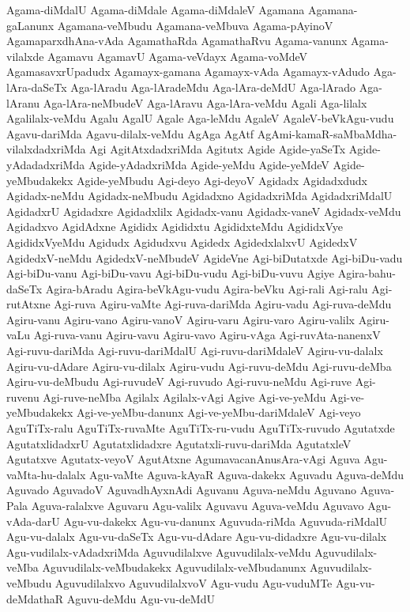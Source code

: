 {Agama-diMdalU
Agama-diMdale
Agama-diMdaleV
Agamana
Agamana-gaLanunx
Agamana-veMbudu
Agamana-veMbuva
Agama-pAyinoV
AgamaparxdhAna-vAda
AgamathaRda
AgamathaRvu
Agama-vanunx
Agama-vilalxde
Agamavu
AgamavU
Agama-veVdayx
Agama-voMdeV
AgamasavxrUpadudx
Agamayx-gamana
Agamayx-vAda
Agamayx-vAdudo
Aga-lAra-daSeTx
Aga-lAradu
Aga-lAradeMdu
Aga-lAra-deMdU
Aga-lArado
Aga-lAranu
Aga-lAra-neMbudeV
Aga-lAravu
Aga-lAra-veMdu
Agali
Aga-lilalx
Agalilalx-veMdu
Agalu
AgalU
Agale
Aga-leMdu
AgaleV
AgaleV-beVkAgu-vudu
Agavu-dariMda
Agavu-dilalx-veMdu
AgAga
AgAtf
AgAmi-kamaR-saMbaMdha-vilalxdadxriMda
Agi
AgitAtxdadxriMda
Agitutx
Agide
Agide-yaSeTx
Agide-yAdadadxriMda
Agide-yAdadxriMda
Agide-yeMdu
Agide-yeMdeV
Agide-yeMbudakekx
Agide-yeMbudu
Agi-deyo
Agi-deyoV
Agidadx
Agidadxdudx
Agidadx-neMdu
Agidadx-neMbudu
Agidadxno
AgidadxriMda
AgidadxriMdalU
AgidadxrU
Agidadxre
Agidadxlilx
Agidadx-vanu
Agidadx-vaneV
Agidadx-veMdu
Agidadxvo
AgidAdxne
Agididx
Agididxtu
AgididxteMdu
AgididxVye
AgididxVyeMdu
Agidudx
Agidudxvu
Agidedx
AgidedxlalxvU
AgidedxV
AgidedxV-neMdu
AgidedxV-neMbudeV
AgideVne
Agi-biDutatxde
Agi-biDu-vadu
Agi-biDu-vanu
Agi-biDu-vavu
Agi-biDu-vudu
Agi-biDu-vuvu
Agiye
Agira-bahu-daSeTx
Agira-bAradu
Agira-beVkAgu-vudu
Agira-beVku
Agi-rali
Agi-ralu
Agi-rutAtxne
Agi-ruva
Agiru-vaMte
Agi-ruva-dariMda
Agiru-vadu
Agi-ruva-deMdu
Agiru-vanu
Agiru-vano
Agiru-vanoV
Agiru-varu
Agiru-varo
Agiru-valilx
Agiru-vaLu
Agi-ruva-vanu
Agiru-vavu
Agiru-vavo
Agiru-vAga
Agi-ruvAta-nanenxV
Agi-ruvu-dariMda
Agi-ruvu-dariMdalU
Agi-ruvu-dariMdaleV
Agiru-vu-dalalx
Agiru-vu-dAdare
Agiru-vu-dilalx
Agiru-vudu
Agi-ruvu-deMdu
Agi-ruvu-deMba
Agiru-vu-deMbudu
Agi-ruvudeV
Agi-ruvudo
Agi-ruvu-neMdu
Agi-ruve
Agi-ruvenu
Agi-ruve-neMba
Agilalx
Agilalx-vAgi
Agive
Agi-ve-yeMdu
Agi-ve-yeMbudakekx
Agi-ve-yeMbu-danunx
Agi-ve-yeMbu-dariMdaleV
Agi-veyo
AguTiTx-ralu
AguTiTx-ruvaMte
AguTiTx-ru-vudu
AguTiTx-ruvudo
Agutatxde
AgutatxlidadxrU
Agutatxlidadxre
Agutatxli-ruvu-dariMda
AgutatxleV
Agutatxve
Agutatx-veyoV
AgutAtxne
AgumavacanAnusAra-vAgi
Aguva
Agu-vaMta-hu-dalalx
Agu-vaMte
Aguva-kAyaR
Aguva-dakekx
Aguvadu
Aguva-deMdu
Aguvado
AguvadoV
AguvadhAyxnAdi
Aguvanu
Aguva-neMdu
Aguvano
Aguva-Pala
Aguva-ralalxve
Aguvaru
Agu-valilx
Aguvavu
Aguva-veMdu
Aguvavo
Agu-vAda-darU
Agu-vu-dakekx
Agu-vu-danunx
Aguvuda-riMda
Aguvuda-riMdalU
Agu-vu-dalalx
Agu-vu-daSeTx
Agu-vu-dAdare
Agu-vu-didadxre
Agu-vu-dilalx
Agu-vudilalx-vAdadxriMda
Aguvudilalxve
Aguvudilalx-veMdu
Aguvudilalx-veMba
Aguvudilalx-veMbudakekx
Aguvudilalx-veMbudanunx
Aguvudilalx-veMbudu
Aguvudilalxvo
AguvudilalxvoV
Agu-vudu
Agu-vuduMTe
Agu-vu-deMdathaR
Aguvu-deMdu
Agu-vu-deMdU
}

